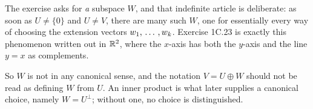 \begin{ainote}
  The exercise asks for \emph{a} subspace $W$, and that indefinite article is deliberate: as soon as $U \neq \{0\}$ and $U \neq V$, there are many such $W$, one for essentially every way of choosing the extension vectors $w_1, {\, \ldots \,\,}, w_k$. Exercise 1C.23 is exactly this phenomenon written out in $\mathbb{R}^2$, where the $x$-axis has both the $y$-axis and the line $y = x$ as complements.

  So $W$ is not  in any canonical sense, and the notation $V = U \oplus W$ should not be read as defining $W$ from $U$. An inner product is what later supplies a canonical choice, namely $W = U^{\perp}$; without one, no choice is distinguished.
\end{ainote}

